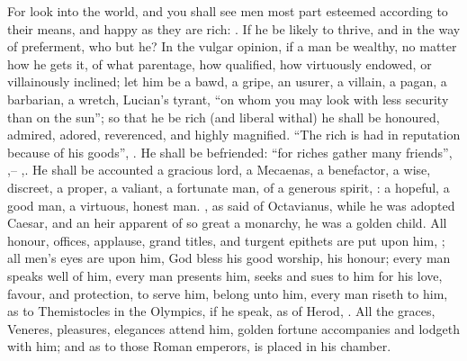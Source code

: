 For look into the world, and you shall see men most part esteemed according to
their means, and happy as they are rich: . If he be likely to thrive, and in the way of
preferment, who but he? In the vulgar opinion, if a man be wealthy, no matter
how he gets it, of what parentage, how qualified, how virtuously endowed, or
villainously inclined; let him be a bawd, a gripe, an usurer, a villain, a
pagan, a barbarian, a wretch, Lucian's tyrant, \enquote{on whom
you may look with less security than on the sun}; so that he be rich (and
liberal withal) he shall be honoured, admired, adored, reverenced, and highly
magnified. \enquote{The rich is had in reputation because of his
goods}, . He shall be befriended: \enquote{for riches gather
many friends}, ,-- ,. He shall be
accounted a gracious lord, a Mecaenas, a benefactor, a wise, discreet, a
proper, a valiant, a fortunate man, of a generous spirit, : a hopeful, a good man, a virtuous, honest man.
, as
\Tully{} said of Octavianus, while he was adopted Caesar, and
an heir apparent of so great a monarchy, he was a golden
child. All honour, offices, applause, grand titles, and
turgent epithets are put upon him, ; all men's eyes
are upon him, God bless his good worship, his honour;
every man speaks well of him, every man presents him,
seeks and sues to him for his love, favour, and protection, to serve him,
belong unto him, every man riseth to him, as to Themistocles in the Olympics,
if he speak, as of Herod, . All the graces, Veneres, pleasures, elegances attend him,
golden fortune accompanies and lodgeth with him; and as to
those Roman emperors, is placed in his chamber.

